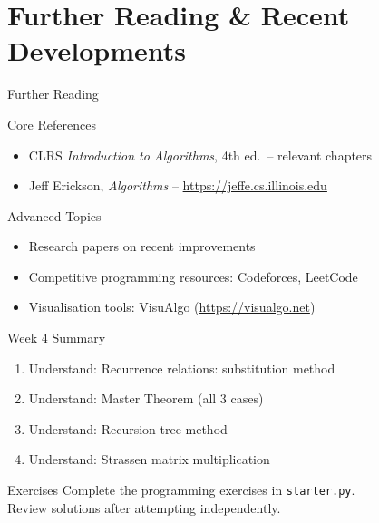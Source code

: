 \documentclass[aspectratio=169,xcolor=dvipsnames]{beamer}
\begin{document}
\section{Further Reading \& Recent Developments}
\begin{frame}{Further Reading}
  \begin{block}{Core References}
    \begin{itemize}
      \item CLRS \textit{Introduction to Algorithms}, 4th ed.\ -- relevant chapters
      \item Jeff Erickson, \textit{Algorithms} -- \url{https://jeffe.cs.illinois.edu}
    \end{itemize}
  \end{block}
  \begin{exampleblock}{Advanced Topics}
    \begin{itemize}
      \item Research papers on recent improvements
      \item Competitive programming resources: Codeforces, LeetCode
      \item Visualisation tools: VisuAlgo (\url{https://visualgo.net})
    \end{itemize}
  \end{exampleblock}
\end{frame}

\begin{frame}{Week 4 Summary}
  \begin{enumerate}
    \item Understand: Recurrence relations: substitution method
    \item Understand: Master Theorem (all 3 cases)
    \item Understand: Recursion tree method
    \item Understand: Strassen matrix multiplication
  \end{enumerate}
  \begin{block}{Exercises}
    Complete the programming exercises in \texttt{starter.py}.\\
    Review solutions after attempting independently.
  \end{block}
\end{frame}
\end{document}
